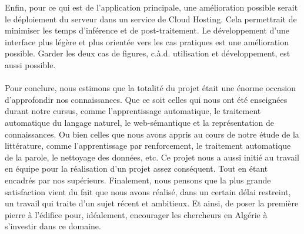 \par
Enfin, pour ce qui est de l'application principale, une amélioration possible serait le déploiement du serveur dans un service de Cloud Hosting. Cela permettrait de minimiser les temps d'inférence et de post-traitement. Le développement d'une interface plus légère et plus orientée vers les cas pratiques est une amélioration possible. Garder les deux cas de figures, c.à.d. utilisation et développement, est aussi possible.

\paragraph{}
Pour conclure, nous estimons que la totalité du projet était une énorme occasion d'approfondir nos connaissances. Que ce soit celles qui nous ont été enseignées durant notre cursus, comme l'apprentissage automatique, le traitement automatique du langage naturel, le web-sémantique et la représentation de connaissances. Ou bien celles que nous avons appris au cours de notre étude de la littérature, comme l'apprentissage par renforcement, le traitement automatique de la parole, le nettoyage des données, etc. Ce projet nous a aussi initié au travail en équipe pour la réalisation d'un projet assez conséquent. Tout en étant encadrés par nos supérieurs.
Finalement, nous pensons que la plus grande satisfaction vient du fait que nous avons réalisé, dans un certain délai restreint, un travail qui traite d'un sujet récent et ambitieux. Et ainsi, de poser la première pierre à l'édifice pour, idéalement, encourager les chercheurs en Algérie à s'investir dans ce domaine. 

